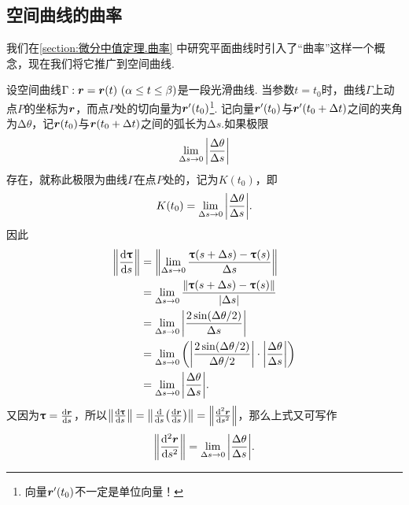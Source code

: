 \subsection{空间曲线的曲率}
我们在\cref{section:微分中值定理.曲率} 中研究平面曲线时引入了“曲率”这样一个概念，现在我们将它推广到空间曲线.

设空间曲线\(\Gamma: \mat{r} = \mat{r}(t)\ (\alpha \leq t \leq \beta)\)是一段光滑曲线.
当参数\(t = t_0\)时，曲线\(\Gamma\)上动点\(P\)的坐标为\(\boldsymbol{r}\)，而点\(P\)处的切向量为\(\boldsymbol{r}'(t_0)\)\footnote{向量\(\boldsymbol{r}'(t_0)\)不一定是单位向量！}.
记向量\(\boldsymbol{r}'(t_0)\)与\(\boldsymbol{r}'(t_0+\Delta t)\)之间的夹角为\(\increment\theta\)，记\(\boldsymbol{r}(t_0)\)与\(\boldsymbol{r}(t_0+\Delta t)\)之间的弧长为\(\increment s\).如果极限\[
\lim\limits_{\Delta s \to 0} \abs{ \frac{\Delta\theta}{\Delta s} }
\]存在，就称此极限为曲线\(\Gamma\)在点\(P\)处的，记为\(K(t_0)\)，即\[
K(t_0) = \lim\limits_{\Delta s \to 0} \abs{ \frac{\Delta\theta}{\Delta s} }.
\]因此\begin{align*}
\norm{ \dv{\boldsymbol{\uptau}}{s} }
&= \norm{ \lim\limits_{\Delta s \to 0} \frac{\boldsymbol{\uptau}(s+\Delta s) - \boldsymbol{\uptau}(s)}{\Delta s} } \\
&= \lim\limits_{\Delta s \to 0} \frac{\norm{\boldsymbol{\uptau}(s+\Delta s) - \boldsymbol{\uptau}(s)}}{\abs{\Delta s}} \\
&= \lim\limits_{\Delta s \to 0} \abs{ \frac{2 \sin(\Delta\theta / 2)}{\Delta s} } \\
&= \lim\limits_{\Delta s \to 0} \left( \abs{ \frac{2 \sin(\Delta\theta / 2)}{\Delta\theta/2} } \cdot \abs{ \frac{\Delta\theta}{\Delta s} } \right) \\
&= \lim\limits_{\Delta s \to 0} \abs{ \frac{\Delta\theta}{\Delta s} }.
\end{align*}
又因为\(\boldsymbol{\uptau} = \dv{\boldsymbol{r}}{s}\)，所以\(\norm{ \dv{\boldsymbol{\uptau}}{s} } = \norm{ \dv{s}( \dv{\boldsymbol{r}}{s} ) } = \norm{ \dv[2]{\boldsymbol{r}}{s} }\)，那么上式又可写作\begin{equation}
\norm{ \dv[2]{\boldsymbol{r}}{s} }
= \lim\limits_{\Delta s \to 0} \abs{ \frac{\Delta\theta}{\Delta s} }.
\end{equation}

